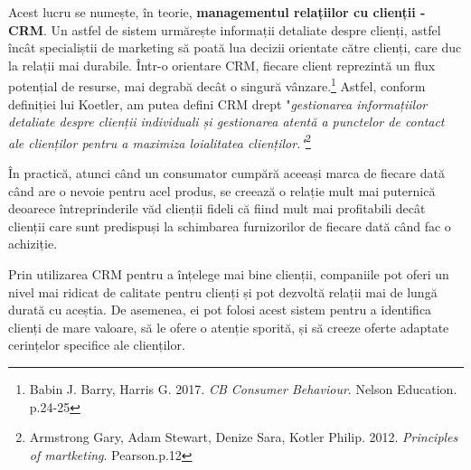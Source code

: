 \documentclass[a4paper, 12pt]{article}
\begin{document}
		\quad Acest lucru se numește, în teorie, \textbf{managementul relațiilor cu clienții - CRM}. Un astfel de sistem  urmărește informații detaliate despre clienți, astfel încât specialiștii de marketing să poată lua decizii orientate către clienți, care duc la relații mai durabile. Într-o orientare CRM, fiecare client reprezintă un flux potențial de resurse, mai degrabă decât o singură vânzare.\footnote{Babin J. Barry, Harris G. 2017. \textit{CB Consumer Behaviour}. Nelson Education. p.24-25} Astfel, conform definiției lui Koetler, am putea defini CRM drept "\textit{gestionarea informațiilor detaliate despre clienții individuali și gestionarea atentă a punctelor de contact ale clienților pentru a maximiza loialitatea clienților."}\footnote{Armstrong Gary, Adam Stewart, Denize Sara, Kotler Philip. 2012. \textit{Principles of martketing}. Pearson.p.12}
		
		\quad În practică, atunci când un consumator cumpără aceeași marca de fiecare dată când are o nevoie pentru acel produs, se creează o relație mult mai puternică deoarece întreprinderile văd clienții fideli că fiind mult mai profitabili decât clienții care sunt predispuși la schimbarea furnizorilor de fiecare dată când fac o achiziție.  
		
		\quad Prin utilizarea CRM pentru a înțelege mai bine clienții, companiile pot oferi un nivel mai ridicat de calitate pentru clienți și pot dezvoltă relații mai de lungă durată cu aceștia. De asemenea, ei pot folosi acest sistem pentru a identifica
		clienți de mare valoare, să le ofere o atenție sporită, și să creeze oferte adaptate cerințelor specifice ale clienților.
		
\end{document}
